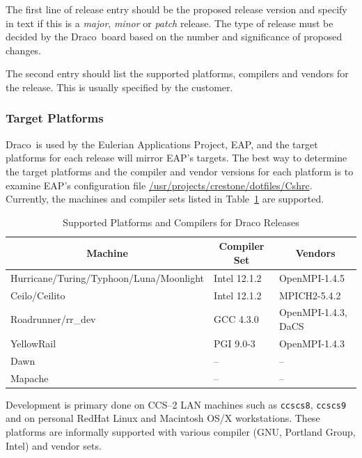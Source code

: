 \documentclass[note]{newmemo}
\newcommand{\draco}{{\normalfont\small\sffamily Draco}}
\begin{document}
The first line of release entry should be the proposed release version
and specify in text if this is a {\it major}, {\it minor} or {\it
  patch} release.  The type of release must be decided by the
\draco\ board based on the number and significance of proposed
changes.

The second entry should list the supported platforms, compilers and
vendors for the release.  This is usually specified by the customer.


\subsubsection{Target Platforms}
\label{sec:target_platforms}

\draco\ is used by the Eulerian Applications Project, EAP, and the
target platforms for each release will mirror EAP's targets.  The best
way to determine the target platforms and the compiler and vendor
versions for each platform is to examine EAP's configuration file
\url{/usr/projects/crestone/dotfiles/Cshrc}.  Currently, the machines
and compiler sets listed in Table~\ref{tab:supported_platforms} are
supported.
%
\begin{table}[ht]
  \caption{Supported Platforms and Compilers for Draco Releases}
  \label{tab:supported_platforms}
\begin{center}
\begin{tabular}{lll} \hline\hline
\multicolumn{1}{c}{Machine} & 
\multicolumn{1}{c}{Compiler Set} & 
\multicolumn{1}{c}{Vendors} \\ \hline
Hurricane/Turing/Typhoon/Luna/Moonlight & Intel 12.1.2 &  OpenMPI-1.4.5 \\
Ceilo/Ceilito         & Intel 12.1.2     &  MPICH2-5.4.2 \\
Roadrunner/rr\_dev    & GCC 4.3.0      &  OpenMPI-1.4.3, DaCS \\
YellowRail            & PGI 9.0-3      &  OpenMPI-1.4.3 \\
Dawn                  & --             &  --             \\
Mapache               & --             & --             \\
\hline\hline
\end{tabular}
\end{center}
\end{table}

Development is primary done on CCS--2 LAN machines such as
\texttt{ccscs8}, \texttt{ccscs9} and on personal RedHat Linux and
Macintosh OS/X workstations.  These platforms are informally supported
with various compiler (GNU, Portland Group, Intel) and vendor sets.  
\end{document}

